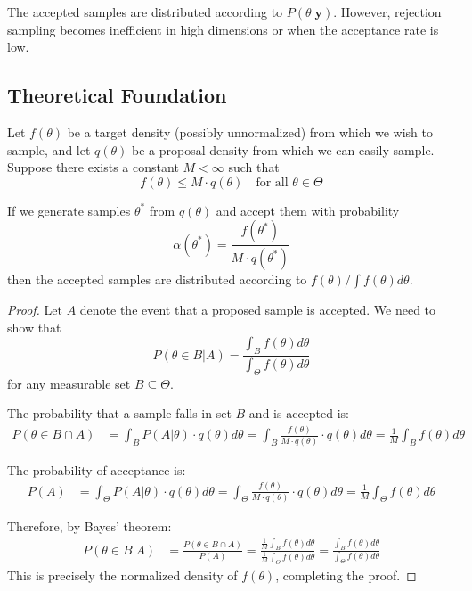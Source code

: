 The accepted samples are distributed according to $P(\theta|\mathbf{y})$. However, rejection sampling becomes inefficient in high dimensions or when the acceptance rate is low.

\subsection{Theoretical Foundation}
\begin{theorem}\label{thm:rejection_sampling}
Let $f(\theta)$ be a target density (possibly unnormalized) from which we wish to sample, and let $q(\theta)$ be a proposal density from which we can easily sample. Suppose there exists a constant $M < \infty$ such that
$$f(\theta) \leq M \cdot q(\theta) \quad \text{for all } \theta \in \Theta$$

If we generate samples $\theta^*$ from $q(\theta)$ and accept them with probability
$$\alpha(\theta^*) = \frac{f(\theta^*)}{M \cdot q(\theta^*)}$$
then the accepted samples are distributed according to $f(\theta)/\int f(\theta)d\theta$.
\end{theorem}

\begin{proof}
Let $A$ denote the event that a proposed sample is accepted. We need to show that
$$P(\theta \in B | A) = \frac{\int_B f(\theta) d\theta}{\int_{\Theta} f(\theta) d\theta}$$
for any measurable set $B \subseteq \Theta$.

The probability that a sample falls in set $B$ and is accepted is:
\begin{align*}
P(\theta \in B \cap A) &= \int_B P(A|\theta) \cdot q(\theta) d\theta = \int_B \frac{f(\theta)}{M \cdot q(\theta)} \cdot q(\theta) d\theta = \frac{1}{M} \int_B f(\theta) d\theta
\end{align*}

The probability of acceptance is:
\begin{align*}
P(A) &= \int_{\Theta} P(A|\theta) \cdot q(\theta) d\theta = \int_{\Theta} \frac{f(\theta)}{M \cdot q(\theta)} \cdot q(\theta) d\theta = \frac{1}{M} \int_{\Theta} f(\theta) d\theta
\end{align*}

Therefore, by Bayes' theorem:
\begin{align*}
P(\theta \in B | A) &= \frac{P(\theta \in B \cap A)}{P(A)} = \frac{\frac{1}{M} \int_B f(\theta) d\theta}{\frac{1}{M} \int_{\Theta} f(\theta) d\theta} = \frac{\int_B f(\theta) d\theta}{\int_{\Theta} f(\theta) d\theta}
\end{align*}
This is precisely the normalized density of $f(\theta)$, completing the proof.
\end{proof}

